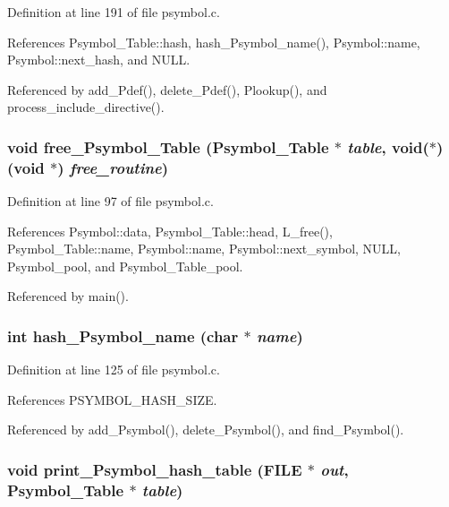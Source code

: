 Definition at line 191 of file psymbol.c.

References Psymbol\_\-Table::hash, hash\_\-Psymbol\_\-name(), Psymbol::name, Psymbol::next\_\-hash, and NULL.

Referenced by add\_\-Pdef(), delete\_\-Pdef(), Plookup(), and process\_\-include\_\-directive().
\subsubsection{\setlength{\rightskip}{0pt plus 5cm}void free\_\-Psymbol\_\-Table (\bf{Psymbol\_\-Table} $\ast$ {\em table}, void($\ast$)(void $\ast$) {\em free\_\-routine})}\label{psymbol_8h_6d76093f228e49068b42c187a149e669}




Definition at line 97 of file psymbol.c.

References Psymbol::data, Psymbol\_\-Table::head, L\_\-free(), Psymbol\_\-Table::name, Psymbol::name, Psymbol::next\_\-symbol, NULL, Psymbol\_\-pool, and Psymbol\_\-Table\_\-pool.

Referenced by main().
\subsubsection{\setlength{\rightskip}{0pt plus 5cm}int hash\_\-Psymbol\_\-name (char $\ast$ {\em name})}\label{psymbol_8h_3eb26afb9e01015e862209de3eb019ff}




Definition at line 125 of file psymbol.c.

References PSYMBOL\_\-HASH\_\-SIZE.

Referenced by add\_\-Psymbol(), delete\_\-Psymbol(), and find\_\-Psymbol().
\subsubsection{\setlength{\rightskip}{0pt plus 5cm}void print\_\-Psymbol\_\-hash\_\-table (FILE $\ast$ {\em out}, \bf{Psymbol\_\-Table} $\ast$ {\em table})}\label{psymbol_8h_73be357f45bd4e9041cd442895b011fc}




